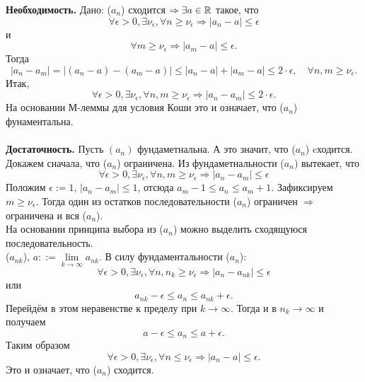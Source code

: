 \begin{Proof}
	\textbf{Необходимость.} Дано: ($a_n$) сходится $\Rightarrow \exists a \in \mathbb{R}$ такое, что $$\forall \epsilon > 0, \exists \nu_\epsilon, \forall n \ge \nu_\epsilon \Rightarrow |a_n - a| \le \epsilon$$ и $$\forall m \ge \nu_\epsilon \Rightarrow |a_m - a| \le \epsilon.$$
	Тогда $$|a_n - a_m| = |(a_n - a)-(a_m - a)| \le |a_n - a| + |a_m - a| \le 2\cdot\epsilon,\quad \forall n, m \ge \nu_\epsilon.$$ Итак, $$\forall \epsilon > 0, \exists \nu_\epsilon, \forall n,m \ge \nu_\epsilon \Rightarrow |a_n - a_m| \le 2\cdot\epsilon.$$
	На основании  М-леммы для условия Коши это и означает, что ($a_n$) фунаментальна.\\\\
	\textbf{Достаточность.} Пусть $(a_n)$ фундаметнальна. А это значит, что ($a_n$) cходится.\\
	Докажем сначала, что ($a_n$) ограничена. Из фундаметнальности ($a_n$) вытекает, что $$\forall\epsilon > 0, \exists \nu_\epsilon, \forall n, m \ge \nu_\epsilon \Rightarrow |a_n - a_m| \le \epsilon$$
	Положим $\epsilon := 1$, $|a_n - a_m|\le1$, отсюда $a_m - 1 \le a_n \le a_m + 1$.
	Зафиксируем $m \ge \nu_\epsilon$. Тогда один из остатков последовательности ($a_n$) ограничен $\Rightarrow$ ограничена и вся ($a_n$).\\
	На основании принципа выбора из ($a_n$) можно выделить сходящуюся последовательность.\\
	($a_{nk}$), $a::= \lim\limits_{k\to\infty} a_{nk}$.
	В силу фундаментальности ($a_n$): $$\forall\epsilon > 0, \exists\nu_\epsilon, \forall n,n_k \ge \nu_\epsilon \Rightarrow |a_n - a_{nk}| \le\epsilon$$ или $$
	a_{nk} - \epsilon \le a_n \le a_{nk} + \epsilon.$$
	Перейдём в этом неравенстве к пределу при $k \to \infty$. Тогда и в $n_k \to \infty$ и получаем $$a - \epsilon \le a_n \le a + \epsilon.$$
	Таким образом $$\forall\epsilon > 0, \exists\nu_\epsilon, \forall n \le \nu_\epsilon \Rightarrow |a_n - a| \le \epsilon.$$ Это и означает, что ($a_n$) сходится.    
\end{Proof}\\
